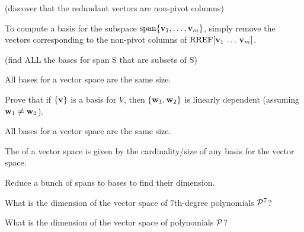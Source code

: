 
\begin{applicationActivities}{3}{15}

\begin{activity}{10}
  (discover that the redundant vectors are non-pivot columns)
\end{activity}

\begin{fact}
  To compute a basis for the subspace \(\vspan\{\vect v_1,\dots,\vect v_m\}\),
  simply remove the vectors corresponding to the non-pivot columns of
  \(\RREF[\vect v_1\,\dots\,\vect v_m]\).
\end{fact}

\begin{activity}{10}
  (find ALL the bases for span S that are subsets of S)
\end{activity}

\begin{fact}
  All bases for a vector space are the same size.
\end{fact}

\begin{activity}{10}
  Prove that if \(\{\vect v\}\) is a basis for \(V\),
  then \(\{\vect w_1,\vect w_2\}\) is linearly dependent (assuming
  \(\vect w_1\not=\vect w_2\)).
\end{activity}

\begin{fact}
  All bases for a vector space are the same size.
\end{fact}

\begin{definition}
  The  of a vector space is given by the cardinality/size
  of any basis for the vector space.
\end{definition}

\begin{activity}{10}
  Reduce a bunch of spans to bases to find their dimension.
\end{activity}

\begin{activity}{5}
  What is the dimension of the vector space of \(7\)th-degree polynomials
  \(\P^7\)?
\end{activity}

\begin{activity}{5}
  What is the dimension of the vector space of polynomials
  \(\P\)?
\end{activity}


\end{applicationActivities}
